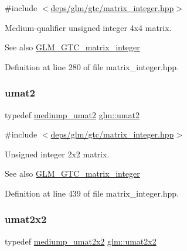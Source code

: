 {\ttfamily \#include $<$\hyperlink{matrix__integer_8hpp}{deps/glm/gtc/matrix\+\_\+integer.\+hpp}$>$}

Medium-\/qualifier unsigned integer 4x4 matrix. \begin{DoxySeeAlso}{See also}
\hyperlink{group__gtc__matrix__integer}{G\+L\+M\+\_\+\+G\+T\+C\+\_\+matrix\+\_\+integer} 
\end{DoxySeeAlso}


Definition at line 280 of file matrix\+\_\+integer.\+hpp.

\mbox{\label{group__gtc__matrix__integer_gae2d45c058cfa0b60ab4df0cdda2d8516}} 
\subsubsection{\texorpdfstring{umat2}{umat2}}
{\footnotesize\ttfamily typedef \hyperlink{group__gtc__matrix__integer_gaafd6d236ce051d138e3fdf53de3813e6}{mediump\+\_\+umat2} \hyperlink{group__gtc__matrix__integer_gae2d45c058cfa0b60ab4df0cdda2d8516}{glm\+::umat2}}



{\ttfamily \#include $<$\hyperlink{matrix__integer_8hpp}{deps/glm/gtc/matrix\+\_\+integer.\+hpp}$>$}

Unsigned integer 2x2 matrix. \begin{DoxySeeAlso}{See also}
\hyperlink{group__gtc__matrix__integer}{G\+L\+M\+\_\+\+G\+T\+C\+\_\+matrix\+\_\+integer} 
\end{DoxySeeAlso}


Definition at line 439 of file matrix\+\_\+integer.\+hpp.

\mbox{\label{group__gtc__matrix__integer_gad3c997b31dd69bdb4787867e758ed48d}} 
\subsubsection{\texorpdfstring{umat2x2}{umat2x2}}
{\footnotesize\ttfamily typedef \hyperlink{group__gtc__matrix__integer_ga539a528818569c17e68e77afce7755c2}{mediump\+\_\+umat2x2} \hyperlink{group__gtc__matrix__integer_gad3c997b31dd69bdb4787867e758ed48d}{glm\+::umat2x2}}



